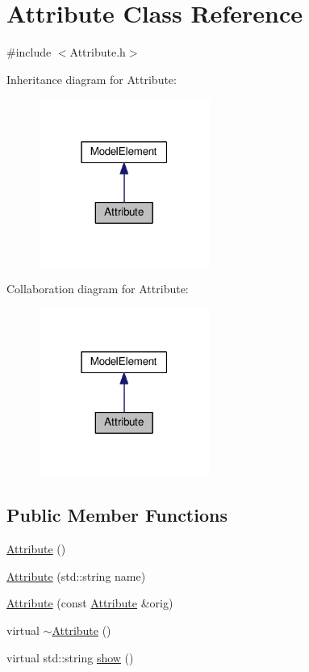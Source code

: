 \hypertarget{class_attribute}{}\section{Attribute Class Reference}
\label{class_attribute}


{\ttfamily \#include $<$Attribute.\+h$>$}



Inheritance diagram for Attribute\+:\nopagebreak
\begin{figure}[H]
\begin{center}
\leavevmode
\includegraphics[width=159pt]{class_attribute__inherit__graph}
\end{center}
\end{figure}


Collaboration diagram for Attribute\+:\nopagebreak
\begin{figure}[H]
\begin{center}
\leavevmode
\includegraphics[width=159pt]{class_attribute__coll__graph}
\end{center}
\end{figure}
\subsection*{Public Member Functions}
\begin{DoxyCompactItemize}
\item 
\hyperlink{class_attribute_a8ba4e5a507aef352563e1e56f1930e66}{Attribute} ()
\item 
\hyperlink{class_attribute_a6c778c020c5b8bd45c194e8d507f1428}{Attribute} (std\+::string name)
\item 
\hyperlink{class_attribute_a8a0c53bda9cc94180f06bda254809261}{Attribute} (const \hyperlink{class_attribute}{Attribute} \&orig)
\item 
virtual \hyperlink{class_attribute_a28ab087bb886728670e4ae5791bc2ea8}{$\sim$\+Attribute} ()
\item 
virtual std\+::string \hyperlink{class_attribute_aa29f79466bd6ed5e36c402ec57cb2050}{show} ()
\end{DoxyCompactItemize}
